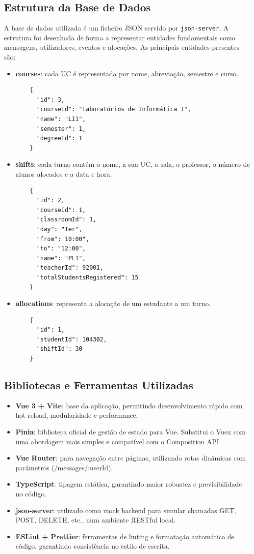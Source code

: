 \documentclass{article}
\begin{document}
\subsection{Estrutura da Base de Dados}
A base de dados utilizada é um ficheiro JSON servido por \texttt{json-server}. A estrutura foi desenhada de forma a representar entidades fundamentais como mensagens, utilizadores, eventos e alocações.
As principais entidades presentes são:

\begin{itemize}
    \item \textbf{courses}: cada UC é representada por nome, abreviação, semestre e curso.
    \begin{verbatim}
    {
      "id": 3,
      "courseId": "Laboratórios de Informática I",
      "name": "LI1",
      "semester": 1,
      "degreeId": 1
    }
    \end{verbatim}
    
    \item \textbf{shifts}: cada turno contém o nome, a sua UC, a sala, o professor, o número de alunos alocados e a data e hora.
    \begin{verbatim}
    {
      "id": 2,
      "courseId": 1,
      "classroomId": 1,
      "day": "Ter",
      "from": 10:00",
      "to": "12:00",
      "name": "PL1",
      "teacherId": 92001,
      "totalStudentsRegistered": 15
    }
    \end{verbatim}
    
    \item \textbf{allocations}: representa a alocação de um estudante a um turno.
    \begin{verbatim}
    {
      "id": 1,
      "studentId": 104302,
      "shiftId": 30
    }
    \end{verbatim}
\end{itemize}

\subsection{Bibliotecas e Ferramentas Utilizadas}
\begin{itemize}
    \item \textbf{Vue 3 + Vite}: base da aplicação, permitindo desenvolvimento rápido com hot-reload, modularidade e performance.
    \item \textbf{Pinia}: biblioteca oficial de gestão de estado para Vue. Substitui o Vuex com uma abordagem mais simples e compatível com o Composition API.
    \item \textbf{Vue Router}: para navegação entre páginas, utilizando rotas dinâmicas com parâmetros (/messages/:userId).
    \item \textbf{TypeScript}: tipagem estática, garantindo maior robustez e previsibilidade no código.
    \item \textbf{json-server}: utilizado como mock backend para simular chamadas GET, POST, DELETE, etc., num ambiente RESTful local.
    \item \textbf{ESLint + Prettier}: ferramentas de linting e formatação automática de código, garantindo consistência no estilo de escrita.
\end{itemize}
\end{document}
